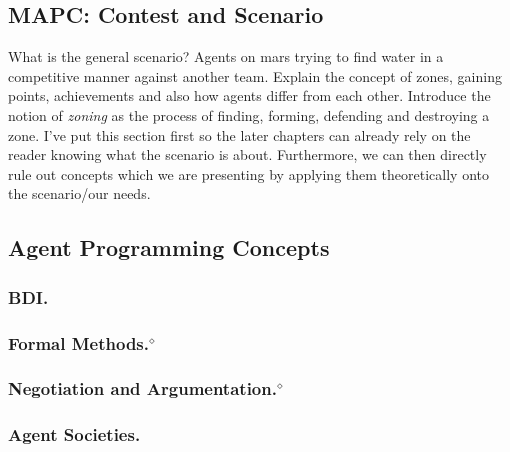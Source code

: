 \subsection{MAPC: Contest and Scenario}
What is the general scenario? Agents on mars trying to find water in a competitive manner against another team. Explain the concept of zones, gaining points, achievements and also how agents differ from each other. Introduce the notion of \emph{zoning} as the process of finding, forming, defending and destroying a zone.
I've put this section first so the later chapters can already rely on the reader knowing what the scenario is about. Furthermore, we can then directly rule out concepts which we are presenting by applying them theoretically onto the scenario/our needs.

\subsection{Agent Programming Concepts}
\subsubsection{BDI.}


\subsubsection[Formal Methods.]{Formal Methods.$^\diamond$}


\subsubsection[Negotiation and Argumentation.]{Negotiation and Argumentation.$^\diamond$}


\subsubsection{Agent Societies.}
